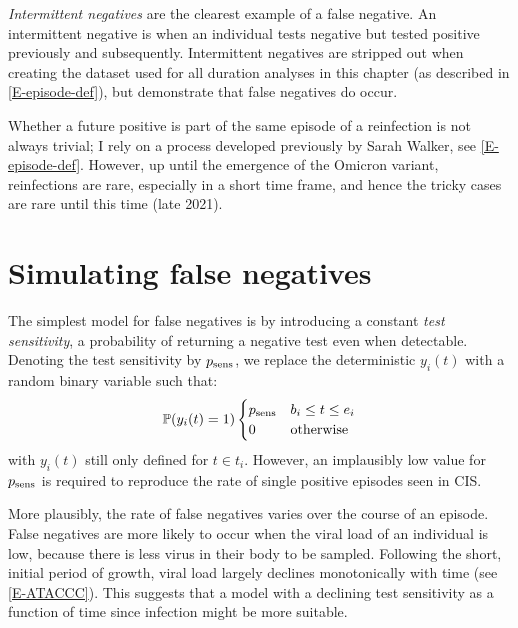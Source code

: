 \documentclass[thesis.tex]{subfiles}
\begin{document}

\emph{Intermittent negatives} are the clearest example of a false negative.
An intermittent negative is when an individual tests negative but tested positive previously and subsequently.
Intermittent negatives are stripped out when creating the dataset used for all duration analyses in this chapter (as described in \cref{E-episode-def}), but demonstrate that false negatives do occur.

Whether a future positive is part of the same episode of a reinfection is not always trivial; I rely on a process developed previously by Sarah Walker, see \cref{E-episode-def}.
However, up until the emergence of the Omicron variant, reinfections are rare, especially in a short time frame, and hence the tricky cases are rare until this time (late 2021).

\section{Simulating false negatives} \label{imperf-test:sec:simulate}

The simplest model for false negatives is by introducing a constant \emph{test sensitivity}, a probability of returning a negative test even when detectable.
Denoting the test sensitivity by $p_\text{sens}$, we replace the deterministic $y_i(t)$ with a random binary variable such that:
\begin{equation}
  \operatorname{\mathbb{P}}(y_i(t) = 1) \begin{cases}
      p_\text{sens} &b_i \leq t \leq e_i \\
      0 &\text{otherwise}
  \end{cases} 
\end{equation}
with $y_i(t)$ still only defined for $t \in t_i$.
However, an implausibly low value for $p_\text{sens}$ is required to reproduce the rate of single positive episodes seen in CIS.

More plausibly, the rate of false negatives varies over the course of an episode.
False negatives are more likely to occur when the viral load of an individual is low, because there is less virus in their body to be sampled.
Following the short, initial period of growth, viral load largely declines monotonically with time (see \cref{E-ATACCC}).
This suggests that a model with a declining test sensitivity as a function of time since infection might be more suitable.
\end{document}
